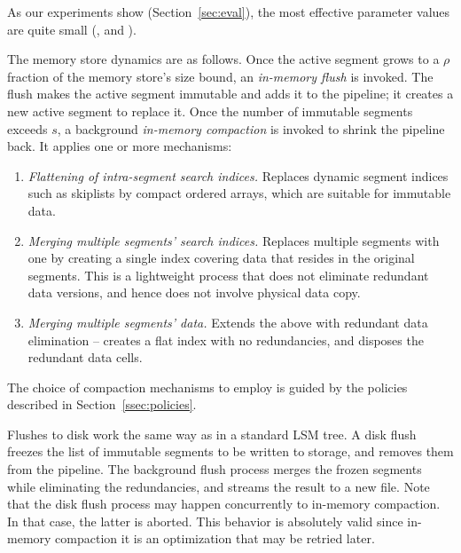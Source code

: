 \noindent
As our experiments show (Section~\ref{sec:eval}), the most effective parameter values are quite small 
(, and ).

The memory store dynamics are as follows. 
Once the active segment grows to a $\rho$ fraction of the memory store's size bound, an \emph{in-memory flush} is invoked.
The flush makes the active segment  immutable and adds it to the pipeline; it creates a new active segment to replace it. 
Once the number of immutable segments exceeds $s$, a background \emph{in-memory compaction} is invoked to shrink
the pipeline back. It applies one or more mechanisms: 
\begin{enumerate}
\item {\em Flattening of intra-segment search indices.} Replaces dynamic segment indices such as skiplists by 
compact ordered arrays, which are suitable for immutable data. 
\item {\em Merging multiple segments' search indices.} 
Replaces multiple segments with one by creating a single index covering data that resides 
in the original segments. This is a lightweight process that does not eliminate redundant 
data versions, and hence does not involve physical data copy. 
\item  {\em Merging multiple segments' data.} Extends the above with redundant data elimination --
creates a flat index with no redundancies, and disposes the redundant data cells. 
\end{enumerate} 
The choice of compaction mechanisms to employ is guided by the policies described in Section~\ref{ssec:policies}.

Flushes to disk work the same way as in a standard LSM tree. A disk flush freezes the list of immutable segments 
to be written to storage, and removes them from the pipeline. The background flush process merges the frozen 
segments while eliminating the redundancies, and streams the result to a new file. Note that the disk flush process
may happen concurrently to in-memory compaction. In that case, the latter is aborted. This behavior is absolutely
valid since in-memory compaction it is an optimization that may be retried later.


